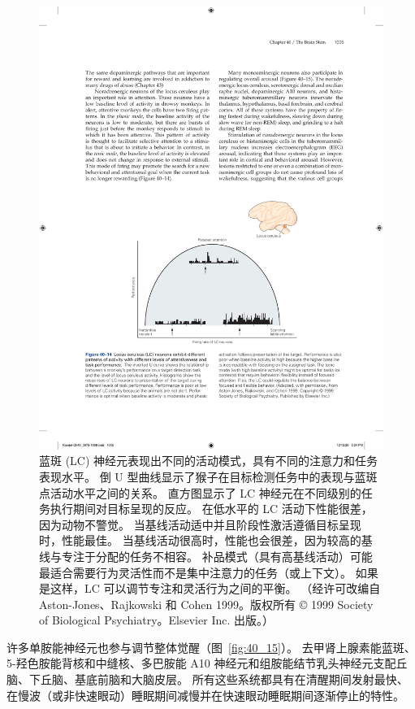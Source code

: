 \begin{figure}[htbp]
	\centering
	\includegraphics[width=0.65\linewidth]{chap40/fig_40_14}
	\caption{蓝斑 (LC) 神经元表现出不同的活动模式，具有不同的注意力和任务表现水平。 倒 U 型曲线显示了猴子在目标检测任务中的表现与蓝斑点活动水平之间的关系。 直方图显示了 LC 神经元在不同级别的任务执行期间对目标呈现的反应。 在低水平的 LC 活动下性能很差，因为动物不警觉。 当基线活动适中并且阶段性激活遵循目标呈现时，性能最佳。 当基线活动很高时，性能也会很差，因为较高的基线与专注于分配的任务不相容。 补品模式（具有高基线活动）可能最适合需要行为灵活性而不是集中注意力的任务（或上下文）。 如果是这样，LC 可以调节专注和灵活行为之间的平衡。 （经许可改编自 Aston-Jones、Rajkowski 和 Cohen 1999。版权所有 © 1999 Society of Biological Psychiatry。Elsevier Inc. 出版。）}
	\label{fig:40_14}
\end{figure}


许多单胺能神经元也参与调节整体觉醒（图~\ref{fig:40_15}）。
去甲肾上腺素能蓝斑、5-羟色胺能背核和中缝核、多巴胺能 A10 神经元和组胺能结节乳头神经元支配丘脑、下丘脑、基底前脑和大脑皮层。
所有这些系统都具有在清醒期间发射最快、在慢波（或非快速眼动）睡眠期间减慢并在快速眼动睡眠期间逐渐停止的特性。


